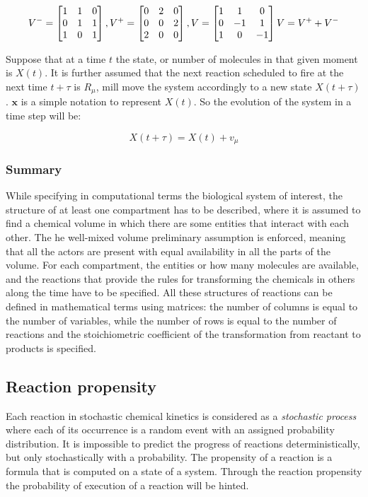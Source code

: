     $$ V^- = \begin{bmatrix}1 & 1 & 0 \\ 0 & 1&1 \\ 1&0&1 \end{bmatrix}, V^+ = \begin{bmatrix}0 & 2 & 0 \\ 0 & 0&2 \\ 2&0&0 \end{bmatrix}, V = \begin{bmatrix}1 & 1 & 0 \\ 0 & -1&1 \\ 1&0&-1 \end{bmatrix}\\ V = V^+ + V^- $$

    Suppose that at a time $t$ the state, or number of molecules in that given moment is $X(t)$.
    It is further assumed that the next reaction scheduled to fire at the next time $t + \tau$ is $R _\mu$, mill move the system accordingly to a new state $X(t + \tau)$.
    $\mathbf{x}$ is a simple notation to represent $X(t)$.
    So the evolution of the system in a time step will be:

    $$ X(t+\tau) = X(t)+v_\mu $$

    \subsubsection{Summary}
    While specifying in computational terms the biological system of interest, the structure of at least one compartment has to be described, where it is assumed to find a chemical volume in which there are some entities that interact with each other.
    The he well-mixed volume preliminary assumption is enforced, meaning that all the actors are present with equal availability in all the parts of the volume.
    For each compartment, the entities or how many molecules are available, and the reactions that provide the rules for transforming the chemicals in others along the time have to be specified.
    All these structures of reactions can be defined in mathematical terms using matrices: the number of columns is equal to the number of variables, while the number of rows is equal to the number of reactions and the stoichiometric coefficient of the transformation from reactant to products is specified.

  \subsection{Reaction propensity}
  Each reaction in stochastic chemical kinetics is considered as a \emph{stochastic process} where each of its occurrence is a random event with an assigned probability distribution.
  It is impossible to predict the progress of reactions deterministically, but only stochastically with a probability.
  The propensity of a reaction is a formula that is computed on a state of a system.
  Through the reaction propensity the probability of execution of a reaction will be hinted.

